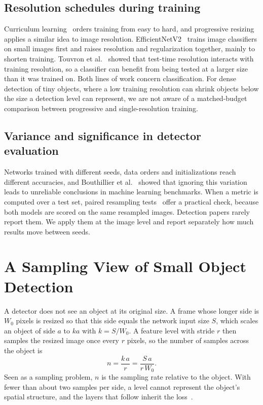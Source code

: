 \documentclass[preprint,12pt]{elsarticle}
\begin{document}
\subsection{Resolution schedules during training}

Curriculum learning~\cite{curriculum-learning} orders training from easy to hard,
and progressive resizing applies a similar idea to image resolution.
EfficientNetV2~\cite{tan2021efficientnetv2} trains image classifiers on small
images first and raises resolution and regularization together, mainly to shorten
training. Touvron et al.~\cite{touvron2019fixres} showed that test-time resolution
interacts with training resolution, so a classifier can benefit from being tested
at a larger size than it was trained on. Both lines of work concern
classification. For dense detection of tiny objects, where a low training
resolution can shrink objects below the size a detection level can represent, we
are not aware of a matched-budget comparison between progressive and
single-resolution training.

\subsection{Variance and significance in detector evaluation}

Networks trained with different seeds, data orders and initializations reach
different accuracies, and Bouthillier et al.~\cite{bouthillier2021variance} showed
that ignoring this variation leads to unreliable conclusions in machine learning
benchmarks. When a metric is computed over a test set, paired resampling
tests~\cite{efron1993bootstrap,bergkirkpatrick2012significance} offer a practical
check, because both models are scored on the same resampled images. Detection
papers rarely report them. We apply them at the image level and report separately
how much results move between seeds.

\section{A Sampling View of Small Object Detection}
\label{sec:sampling}

A detector does not see an object at its original size. A frame whose longer side
is $W_0$ pixels is resized so that this side equals the network input size $S$,
which scales an object of side $a$ to $ka$ with $k=S/W_0$. A feature level with
stride $r$ then samples the resized image once every $r$ pixels, so the number of
samples across the object is
\begin{equation}
  n = \frac{k\,a}{r} = \frac{S\,a}{r\,W_0}.
  \label{eq:samples}
\end{equation}
Seen as a sampling problem, $n$ is the sampling rate relative to the object.
With fewer than about two samples per side, a level cannot represent the object's
spatial structure, and the layers that follow inherit the
loss~\cite{shannon1949communication,zhang2019antialiased}.
\end{document}
